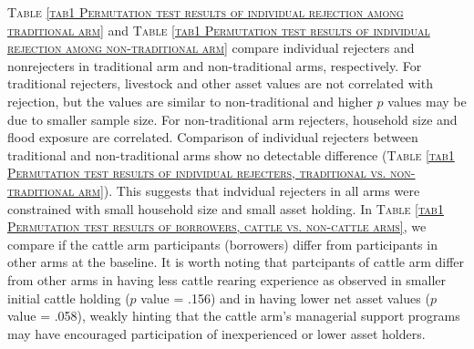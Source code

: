 	\textsc{\normalsize Table \ref{tab1 Permutation test results of individual rejection among traditional arm}} and \textsc{\normalsize Table \ref{tab1 Permutation test results of individual rejection among non-traditional arm}} compare individual rejecters and nonrejecters in \textsf{traditional} arm and non-\textsf{traditional} arms, respectively. For \textsf{traditional} rejecters, livestock and other asset values are not correlated with rejection, but the values are similar to non-\textsf{traditional} and higher $p$ values may be due to smaller sample size. For non-\textsf{traditional} arm rejecters, household size and flood exposure are correlated. Comparison of individual rejecters between \textsf{traditional} and non-\textsf{traditional} arms show no detectable difference (\textsc{\normalsize Table \ref{tab1 Permutation test results of individual rejecters, traditional vs. non-traditional arm}}). This suggests that indvidual rejecters in all arms were constrained with small household size and small asset holding. In \textsc{\normalsize Table \ref{tab1 Permutation test results of borrowers, cattle vs. non-cattle arms}}, we compare if the \textsf{cattle} arm participants (borrowers) differ from participants in other arms at the baseline. It is worth noting that partcipants of \textsf{cattle} arm differ from other arms in having less cattle rearing experience as observed in smaller initial cattle holding ($p$ value = .156) and in having lower net asset values ($p$ value = .058), weakly hinting that the \textsf{cattle} arm's managerial support programs may have encouraged participation of inexperienced or lower asset holders. \label{RejectionLastPage}


